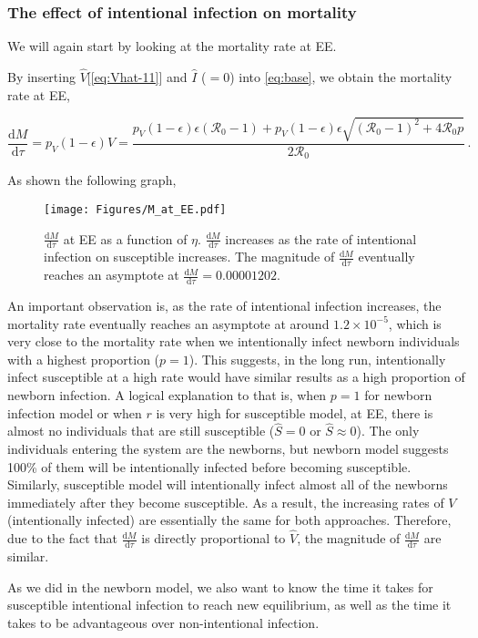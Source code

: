 \documentclass[12pt]{article}
\newcommand\dbyd[2]{\frac{\mathrm d{#1}}{\mathrm d{#2}}}
\newcommand{\R}{\mathcal{R}}
\newcommand{\pmV}{p_{V}}
\begin{document}
\subsubsection{The effect of intentional infection on mortality}
We will again start by looking at the mortality rate at EE.

By inserting $\hat{V}$[\autoref{eq:Vhat-11}] and $\hat{I}$ ($=0$) into \autoref{eq:base}, we obtain the mortality rate at EE,
\begin{linenomath*}
\begin{equation}
\dbyd{M}{\tau}=\pmV(1-\epsilon)V=\frac{\pmV(1-\epsilon)\epsilon(\R_0 -1)+ \pmV(1-\epsilon)\epsilon \sqrt{(\R_0-1)^2+4\R_0 p}}{2\R_0}\,. \label{eq:dMdt}
\end{equation}
\end{linenomath*}
As shown the following graph,
\begin{figure}[H]
  \centering
  \texttt{[image: Figures/M\_at\_EE.pdf]}
  \caption{$\dbyd{M}{\tau}$ at EE as a function of $\eta$. $\dbyd{M}{\tau}$ increases as the rate of intentional infection on susceptible increases. The magnitude of $\dbyd{M}{\tau}$ eventually reaches an asymptote at $\dbyd{M}{\tau}=0.00001202$.}
\end{figure}

An important observation is, as the rate of intentional infection increases, the mortality rate eventually reaches an asymptote at around $1.2\times10^{-5}$, which is very close to the mortality rate when we intentionally infect newborn individuals with a highest proportion ($p=1$). This suggests, in the long run, intentionally infect susceptible at a high rate would have similar results as a high proportion of newborn infection. A logical explanation to that is, when $p=1$ for newborn infection model or when $r$ is very high for susceptible model, at EE, there is almost no individuals that are still susceptible ($\hat{S}=0$ or $\hat{S}\approx0$). The only individuals entering the system are the newborns, but newborn model suggests 100\% of them will be intentionally infected before becoming susceptible. Similarly, susceptible model will intentionally infect almost all of the newborns immediately after they become susceptible. As a result, the increasing rates of $V$ (intentionally infected) are essentially the same for both approaches. Therefore, due to the fact that $\dbyd{M}{\tau}$ is directly proportional to $\hat{V}$, the magnitude of $\dbyd{M}{\tau}$ are similar.


As we did in the newborn model, we also want to know the time it takes for susceptible intentional infection to reach new equilibrium, as well as the time it takes to be advantageous over non-intentional infection.
\end{document}
